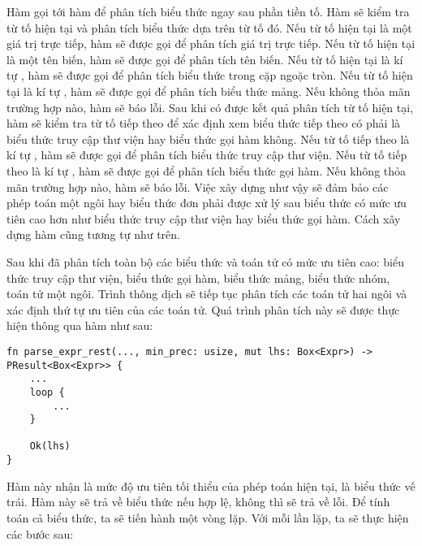     Hàm  gọi tới hàm  để phân tích biểu thức ngay sau phần tiền tố. Hàm  sẽ kiểm tra từ tố hiện tại và phân tích biểu thức dựa trên từ tố đó. Nếu từ tố hiện tại là một giá trị trực tiếp, hàm  sẽ được gọi để phân tích giá trị trực tiếp. Nếu từ tố hiện tại là một tên biến, hàm  sẽ được gọi để phân tích tên biến. Nếu từ tố hiện tại là kí tự \kw{(}, hàm  sẽ được gọi để phân tích biểu thức trong cặp ngoặc tròn. Nếu từ tố hiện tại là kí tự \kw{[}, hàm  sẽ được gọi để phân tích biểu thức mảng. Nếu không thỏa mãn trường hợp nào, hàm sẽ báo lỗi. Sau khi có được kết quả phân tích từ tố hiện tại, hàm  sẽ kiểm tra từ tố tiếp theo để xác định xem biểu thức tiếp theo có phải là biểu thức truy cập thư viện hay biểu thức gọi hàm không. Nếu từ tố tiếp theo là kí tự , hàm  sẽ được gọi để phân tích biểu thức truy cập thư viện. Nếu từ tố tiếp theo là kí tự \kw{(}, hàm  sẽ được gọi để phân tích biểu thức gọi hàm. Nếu không thỏa mãn trường hợp nào, hàm sẽ báo lỗi. Việc xây dựng như vậy sẽ đảm bảo các phép toán một ngôi hay biểu thức đơn phải được xử lý sau biểu thức có mức ưu tiên cao hơn như biểu thức truy cập thư viện hay biểu thức gọi hàm. Cách xây dựng hàm  cũng tương tự như trên.

    Sau khi đã phân tích toàn bộ các biểu thức và toán tử có mức ưu tiên cao: biểu thức truy cập thư viện, biểu thức gọi hàm, biểu thức mảng, biểu thức nhóm, toán tử một ngôi. Trình thông dịch sẽ tiếp tục phân tích các toán tử hai ngôi và xác định thứ tự ưu tiên của các toán tử. Quá trình phân tích này sẽ được thực hiện thông qua hàm  như sau:

\begin{lstlisting}[]
fn parse_expr_rest(..., min_prec: usize, mut lhs: Box<Expr>) -> PResult<Box<Expr>> {
    ...
    loop {
        ...
    }

    Ok(lhs)
}
\end{lstlisting}

Hàm này nhận  là mức độ ưu tiên tối thiểu của phép toán hiện tại,  là biểu thức vế trái. Hàm này sẽ trả về biểu thức nếu hợp lệ, không thì sẽ trả về lỗi. Để tính toán cả biểu thức, ta sẽ tiến hành một vòng lặp. Với mỗi lần lặp, ta sẽ thực hiện các bước sau:

